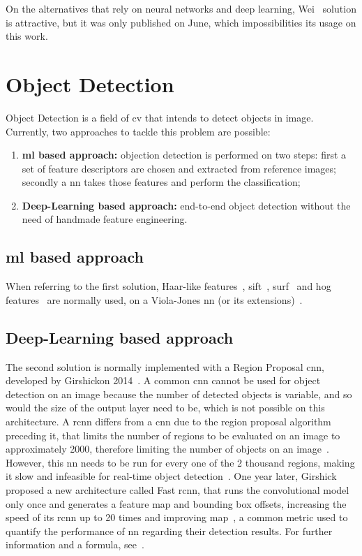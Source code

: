 On the alternatives that rely on neural networks and deep learning, Wei\etal~\cite{Wei2018} solution is attractive, but it was only published on June, which impossibilities its usage on this work.

\section{Object Detection}
\label{sec:sota:object-detection}

Object Detection is a field of \acl{cv} that intends to detect objects in image. Currently, two approaches to tackle this problem are possible:

\begin{enumerate}
	\item \textbf{\acl{ml} based approach:} objection detection is performed on two steps: first a set of feature descriptors are chosen and extracted from reference images; secondly a \acf{nn} takes those features and perform the classification;
	\item \textbf{Deep-Learning based approach:} end-to-end object detection without the need of handmade feature engineering.
\end{enumerate}

\subsection{\ac{ml} based approach}
When referring to the first solution, Haar-like features~\cite{Messom2006}, \ac{sift}~\cite{Hughes2011a}, \ac{surf}~\cite{Bay2008} and \ac{hog} features~\cite{Dalal2010, Surasak2018} are normally used, on a Viola-Jones \ac{nn} (or its extensions)~\cite{Viola2001, ViolaP2004}. %

\subsection{Deep-Learning based approach}
The second solution is normally implemented with a Region Proposal \acf{cnn}, developed by Girshick\etal on 2014~\cite{Girshick2014}. A common \ac{cnn} cannot be used for object detection on an image because the number of detected objects is variable, and so would the size of the output layer need to be, which is not possible on this architecture. A \ac{rcnn} differs from a \ac{cnn} due to the region proposal algorithm preceding it, that limits the number of regions to be evaluated on an image to approximately 2000, therefore limiting the number of objects on an image~\cite{Girshick2014}. However, this \acl{nn} needs to be run for every one of the 2 thousand regions, making it slow and infeasible for real-time object detection~\cite{Girshick2014}. One year later, Girshick proposed a new architecture called Fast \ac{rcnn}, that runs the convolutional model only once and generates a feature map and bounding box offsets, increasing the speed of its \ac{rcnn} up to 20 times and improving \ac{map}~\cite{Girshick2015}, a common metric used to quantify the performance of \ac{nn} regarding their detection results. For further information and a formula, see~\cite{mAP, AP}.

